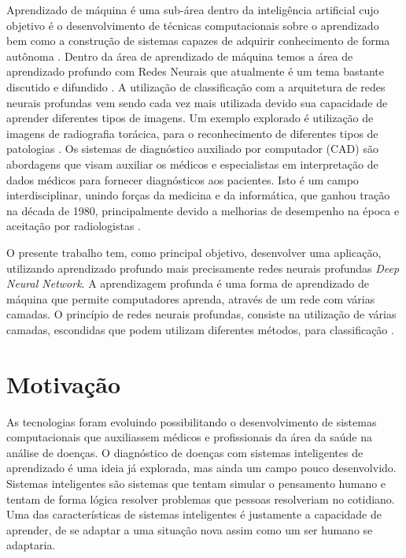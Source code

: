 \documentclass[openright]{UFRGS} %
\begin{document}
Aprendizado de máquina é uma sub-área dentro da inteligência artificial cujo objetivo é o desenvolvimento de técnicas computacionais sobre o aprendizado bem como a construção de sistemas capazes de adquirir conhecimento de forma autônoma \cite{lorena2000inteligencia}. Dentro da área de aprendizado de máquina temos a área de aprendizado profundo com Redes Neurais que atualmente é um tema bastante discutido e difundido \cite{azevedo2018computaccao}. A utilização de classificação com a arquitetura de redes neurais profundas vem sendo cada vez mais utilizada  devido sua capacidade de aprender diferentes tipos de imagens. Um exemplo explorado é utilização de imagens de radiografia torácica, para o reconhecimento de diferentes tipos de patologias \cite{bar2015deep}. Os sistemas de diagnóstico auxiliado por computador (CAD) são abordagens que visam auxiliar os médicos
e especialistas em interpretação de dados médicos para fornecer diagnósticos aos pacientes. Isto é
um campo interdisciplinar, unindo forças da medicina e da informática, que ganhou
tração na década de 1980, principalmente devido a melhorias de desempenho na época e aceitação
por radiologistas \cite{jiang1999improving}.  

 
O presente trabalho tem, como principal objetivo, desenvolver uma aplicação, utilizando aprendizado profundo mais precisamente redes neurais profundas \textit{Deep Neural Network}. A aprendizagem profunda é uma forma de aprendizado de máquina que permite
computadores aprenda, através de um rede com várias camadas.
O princípio  de  redes neurais profundas, 
consiste na utilização de várias camadas, 
escondidas que podem utilizam diferentes métodos, 
para classificação \cite{goodfellow2016deep}. 


\section{Motivação}

As tecnologias foram evoluindo possibilitando o desenvolvimento de sistemas computacionais que auxiliassem médicos e profissionais da área da saúde na análise de doenças. O diagnóstico de doenças com sistemas inteligentes de aprendizado é uma ideia já explorada, mas ainda um campo pouco desenvolvido. Sistemas inteligentes são sistemas que tentam simular o pensamento humano e tentam de forma lógica resolver problemas que pessoas resolveriam no cotidiano. Uma das características de sistemas inteligentes é justamente a capacidade de aprender, de se adaptar a uma situação nova assim como um ser humano se adaptaria. 
\end{document}
